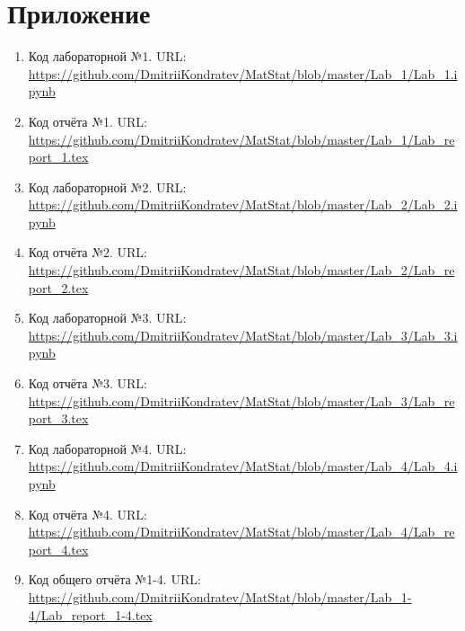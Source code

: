 \documentclass[12pt,a4paper]{article}
\begin{document}
\section{Приложение}
	\begin{enumerate}
		\item Код лабораторной №1. URL: \url{https://github.com/DmitriiKondratev/MatStat/blob/master/Lab_1/Lab_1.ipynb}
		
		\item Код отчёта №1. URL: \url{https://github.com/DmitriiKondratev/MatStat/blob/master/Lab_1/Lab_report_1.tex}
		
		\item Код лабораторной №2. URL: \url{https://github.com/DmitriiKondratev/MatStat/blob/master/Lab_2/Lab_2.ipynb}
		
		\item Код отчёта №2. URL: \url{https://github.com/DmitriiKondratev/MatStat/blob/master/Lab_2/Lab_report_2.tex}
		
		\item Код лабораторной №3. URL: \url{https://github.com/DmitriiKondratev/MatStat/blob/master/Lab_3/Lab_3.ipynb}
		
		\item Код отчёта №3. URL: \url{https://github.com/DmitriiKondratev/MatStat/blob/master/Lab_3/Lab_report_3.tex}
		
		\item Код лабораторной №4. URL: \url{https://github.com/DmitriiKondratev/MatStat/blob/master/Lab_4/Lab_4.ipynb}
		
		\item Код отчёта №4. URL: \url{https://github.com/DmitriiKondratev/MatStat/blob/master/Lab_4/Lab_report_4.tex}
		
		\item Код общего отчёта №1-4. URL: \url{https://github.com/DmitriiKondratev/MatStat/blob/master/Lab_1-4/Lab_report_1-4.tex}	
	\end{enumerate}
\end{document}
